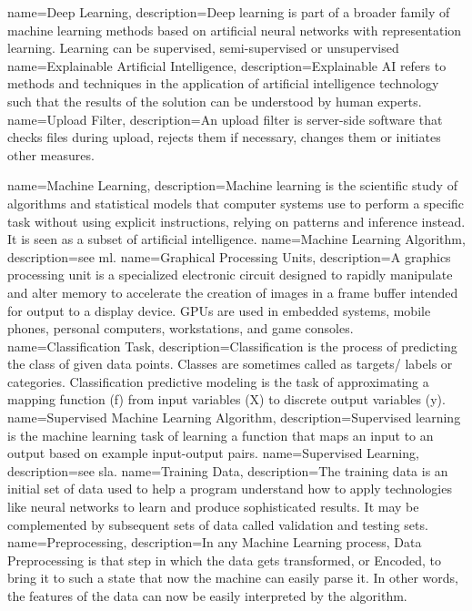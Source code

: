 {
 name=Deep Learning,
 description={Deep learning is part of a broader family of machine learning methods based on artificial neural networks with representation learning. Learning can be supervised, semi-supervised or unsupervised}
}
{
 name=Explainable Artificial Intelligence,
 description={Explainable AI refers to methods and techniques in the application of artificial intelligence technology such that the results of the solution can be understood by human experts.
 }
}
{
 name=Upload Filter,
 description={An upload filter is server-side software that checks files during upload, rejects them if necessary, changes them or initiates other measures.
 }
}

{
 name=Machine Learning,
 description={Machine learning is the scientific study of algorithms and statistical models that computer systems use to perform a specific task without using explicit instructions, relying on patterns and inference instead. It is seen as a subset of artificial intelligence.
 }
}
{
 name=Machine Learning Algorithm,
 description={see \Gls{ml}.
 }
}
{
 name=Graphical Processing Units,
 description={A graphics processing unit is a specialized electronic circuit designed to rapidly manipulate and alter memory to accelerate the creation of images in a frame buffer intended for output to a display device. GPUs are used in embedded systems, mobile phones, personal computers, workstations, and game consoles.
 }
}
{
 name=Classification Task,
 description={Classification is the process of predicting the class of given data points. Classes are sometimes called as targets/ labels or categories. Classification predictive modeling is the task of approximating a mapping function (f) from input variables (X) to discrete output variables (y).
 }
}
{
name=Supervised Machine Learning Algorithm,
description={Supervised learning is the machine learning task of learning a function that maps an input to an output based on example input-output pairs.
}
}
{
 name=Supervised Learning,
 description={see \Gls{sla}.
 }
}
{
 name=Training Data,
 description={The training data is an initial set of data used to help a program understand how to apply technologies like neural networks to learn and produce sophisticated results. It may be complemented by subsequent sets of data called validation and testing sets.
 }
}
{
 name=Preprocessing,
 description={In any Machine Learning process, Data Preprocessing is that step in which the data gets transformed, or Encoded, to bring it to such a state that now the machine can easily parse it. In other words, the features of the data can now be easily interpreted by the algorithm.
 }
}
